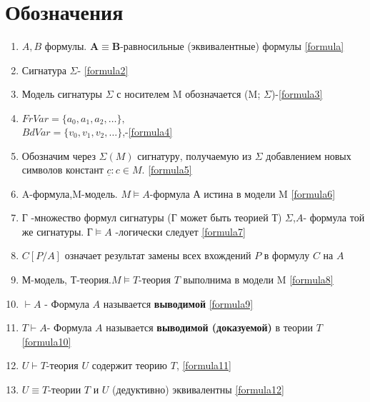 \section*{ Обозначения}
\begin{enumerate}
\item $A,B$ формулы. {$\boldsymbol{A}\equiv \boldsymbol{B}$}-равносильные (эквивалентные) формулы \ref{formula}
\item Сигнатура $\Sigma$- \ref{formula2}
\item Модель сигнатуры $\varSigma $ с носителем M обозначается (M; $\varSigma$)-\ref{formula3}
\item $ FrVar = \{a_{0}, a_{1}, a_{2}, \ldots \},$\\
$ BdVar = \{v_{0}, v_{1},v_{2}, \ldots \}$,-\ref{formula4}
\item Обозначим через $ \Sigma(M)$ сигнатуру, получаемую из $  \Sigma$ добавлением новых символов констант ${\underline {c} : c \in M.  } $ \ref{formula5}
\item A-формула,M-модель. $ M \vDash A $-формула А истина в модели M \ref{formula6}
\item Г -множество формул сигнатуры (Г может быть теорией Т) $\Sigma$,$A$- формула той же сигнатуры. $\text{Г}\vDash A$ -логически следует \ref{formula7}
\item $C[P/A]$ означает результат замены всех вхождений $P$ в формулу $C$ на $A$
\item М-модель, Т-теория.$M\vDash T$-теория $T$ выполнима в модели M \ref{formula8}
\item $\vdash A$ - Формула $A$ называется \textbf{выводимой} \ref{formula9}
\item $T \vdash A$- Формула $A$ называется \textbf{выводимой (доказуемой)} в теории $T$ \ref{formula10}
\item $U \vdash T$-теория $U$ содержит теорию $T$, \ref{formula11}
\item $U \equiv T$-теории $T$ и $U$ (дедуктивно) эквивалентны \ref{formula12}
\end{enumerate}